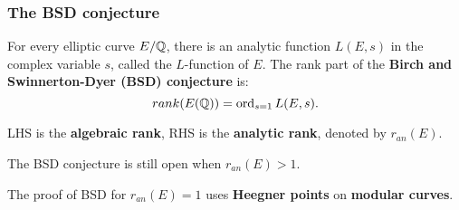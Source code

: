 \documentclass[handout]{beamer}
\begin{document}
\begin{frame}
\frametitle{The BSD conjecture} 



\medskip

For every elliptic curve $E/\mathbb{Q}$, there is an analytic function $L(E,s)$ in the complex variable $s$, called the {$L$-function of $E$}. The rank part of the  {\bf Birch and Swinnerton-Dyer (BSD) conjecture} is:
\begin{equation*}
	rank(E(\mathbb{Q})) = \operatorname{ord}_{s=1}L(E,s).
\end{equation*}

\pause

LHS is the {\bf algebraic rank}, RHS is the {\bf analytic rank}, denoted by $r_{an}(E)$. \\

\medskip

\pause

The BSD conjecture is still open when $r_{an}(E) > 1$. \\

\medskip

\pause

The proof of BSD for $r_{an}(E) = 1$ uses {\bf Heegner points} on {\bf modular curves}.


\end{frame}


\end{document}
